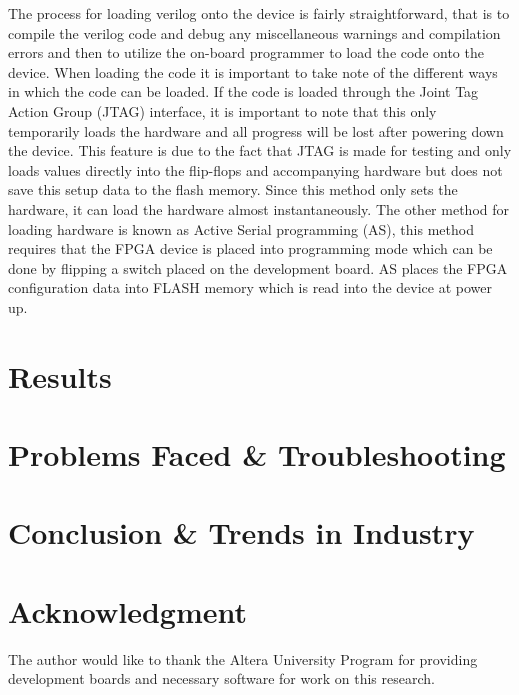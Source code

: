 \documentclass[conference]{IEEEtran}
\begin{document}
The process for loading verilog onto the device is fairly straightforward, that is to compile the verilog code and debug any miscellaneous warnings and compilation errors and then to utilize the on-board programmer to load the code onto the device. When loading the code it is important to take note of the different ways in which the code can be loaded. If the code is loaded through the Joint Tag Action Group (JTAG) interface, it is important to note that this only temporarily loads the hardware and all progress will be lost after powering down the device. This feature is due to the fact that JTAG is made for testing and only loads values directly into the flip-flops and accompanying hardware but does not save this setup data to the flash memory. Since this method only sets the hardware, it can load the hardware almost instantaneously. The other method for loading hardware is known as Active Serial programming (AS), this method requires that the FPGA device is placed into programming mode which can be done by flipping a switch placed on the development board. AS places the FPGA configuration data into FLASH memory which is read into the device at power up. 

\section{Results}

\section{Problems Faced \& Troubleshooting}

\section{Conclusion \& Trends in Industry}


\section*{Acknowledgment}
The author would like to thank the Altera University Program \cite{UniProgram} for providing development boards and necessary software for work on this research.

\appendix
\label{App:AppendixA}
\end{document}
